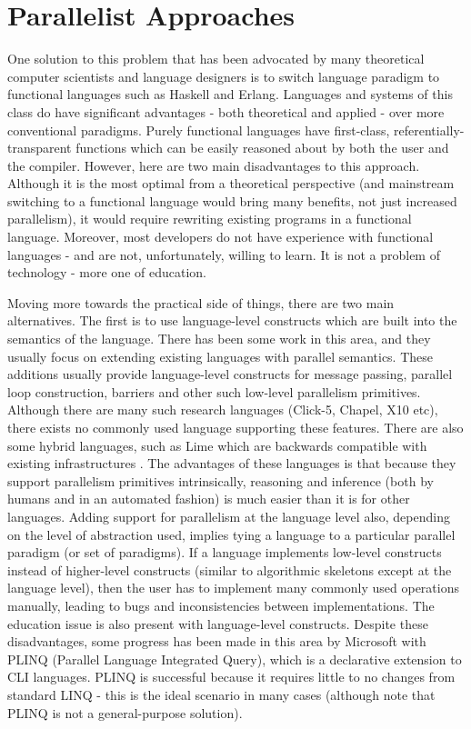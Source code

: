 \section{Parallelist Approaches} \label{sec:introduction/parallelist}
One solution to this problem that has been advocated by many theoretical computer scientists and language designers is to switch language paradigm to functional languages such as Haskell and Erlang. Languages and systems of this class do have significant advantages - both theoretical and applied - over more conventional paradigms. Purely functional languages have first-class, referentially-transparent functions which can be easily reasoned about by both the user and the compiler. However, here are two main disadvantages to this approach. Although it is the most optimal from a theoretical perspective (and mainstream switching to a functional language would bring many benefits, not just increased parallelism), it would require rewriting existing programs in a functional language. Moreover, most developers do not have experience with functional languages - and are not, unfortunately, willing to learn. It is not a problem of technology - more one of education.

Moving more towards the practical side of things, there are two main alternatives. The first is to use language-level constructs which are built into the semantics of the language. There has been some work in this area, and they usually focus on extending existing languages with parallel semantics. These additions usually provide language-level constructs for message passing, parallel loop construction, barriers and other such low-level parallelism primitives. Although there are many such research languages (Click-5, Chapel, X10 etc), there exists no commonly used language supporting these features. There are also some hybrid languages, such as Lime which are backwards compatible with existing infrastructures \citep{Dubach2012}. The advantages of these languages is that because they support parallelism primitives intrinsically, reasoning and inference (both by humans and in an automated fashion) is much easier than it is for other languages. Adding support for parallelism at the language level also, depending on the level of abstraction used, implies tying a language to a particular parallel paradigm (or set of paradigms). If a language implements low-level constructs instead of higher-level constructs (similar to algorithmic skeletons except at the language level), then the user has to implement many commonly used operations manually, leading to bugs and inconsistencies between implementations. The education issue is also present with language-level constructs. Despite these disadvantages, some progress has been made in this area by Microsoft with PLINQ (Parallel Language Integrated Query), which is a declarative extension to CLI languages. PLINQ is successful because it requires little to no changes from standard LINQ - this is the ideal scenario in many cases (although note that PLINQ is not a general-purpose solution).

